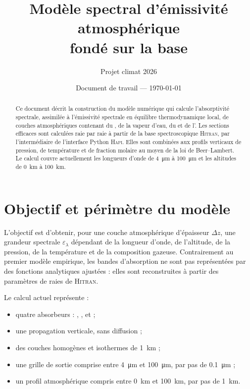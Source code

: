\documentclass[11pt,a4paper]{article}
\title{Modèle spectral d'émissivité atmosphérique\\fondé sur la base \HITRAN}
\author{Projet climat 2026}
\date{Document de travail --- \today}
\newcommand{\HITRAN}{\textsc{Hitran}}
\newcommand{\HAPI}{\textsc{Hapi}}
\begin{document}
\maketitle

\begin{abstract}
Ce document décrit la construction du modèle numérique qui calcule
l'absorptivité spectrale, assimilée à l'émissivité spectrale en équilibre
thermodynamique local, de couches atmosphériques contenant du
, de la vapeur d'eau, du  et de l'. Les sections
efficaces sont calculées raie par raie à partir de la base spectroscopique
\HITRAN, par l'intermédiaire de l'interface Python \HAPI. Elles sont combinées
aux profils verticaux de pression, de température et de fraction molaire au
moyen de la loi de Beer--Lambert. Le calcul couvre actuellement les longueurs
d'onde de \SI{4}{\micro\metre} à \SI{100}{\micro\metre} et les altitudes de
\SI{0}{\kilo\metre} à \SI{100}{\kilo\metre}.
\end{abstract}

\tableofcontents
\newpage

\section{Objectif et périmètre du modèle}

L'objectif est d'obtenir, pour une couche atmosphérique d'épaisseur
$\Delta z$, une grandeur spectrale $\varepsilon_\lambda$ dépendant de la
longueur d'onde, de l'altitude, de la pression, de la température et de la
composition gazeuse. Contrairement au premier modèle empirique, les bandes
d'absorption ne sont pas représentées par des fonctions analytiques ajustées :
elles sont reconstruites à partir des paramètres de raies de \HITRAN.

Le calcul actuel représente :

\begin{itemize}[itemsep=2pt]
  \item quatre absorbeurs : , ,  et  ;
  \item une propagation verticale, sans diffusion ;
  \item des couches homogènes et isothermes de \SI{1}{\kilo\metre} ;
  \item une grille de sortie comprise entre \SI{4}{\micro\metre} et
        \SI{100}{\micro\metre}, par pas de \SI{0.1}{\micro\metre} ;
  \item un profil atmosphérique compris entre \SI{0}{\kilo\metre} et
        \SI{100}{\kilo\metre}, par pas de \SI{1}{\kilo\metre}.
\end{itemize}
\end{document}
